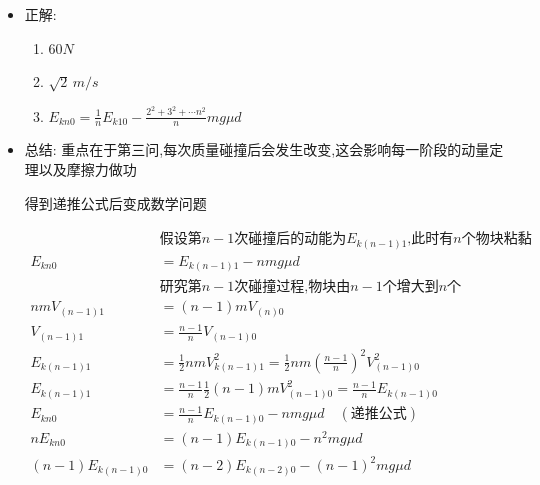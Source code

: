 \documentclass{article}
\begin{document}
\begin{itemize}
    \item 正解: \begin{enumerate}[label = (\arabic*)]
              \item $60N$
              \item $\sqrt{2} \, m \slash s$
              \item $E_{kn0} = \frac{1}{n} E_{k10} - \frac{2^{2} + 3^{2} + \cdots n^{2}}{n} mg\mu d$
          \end{enumerate}
    \item 总结: 重点在于第三问,每次质量碰撞后会发生改变,这会影响每一阶段的动量定理以及摩擦力做功

          \hspace{3em}得到递推公式后变成数学问题

          \begin{align*}
                                & \text{假设第}n-1\text{次碰撞后的动能为}  E_{k(n-1)1}\text{,此时有}n\text{个物块粘黏}                      \\
              E_{kn0}           & = E_{k(n-1)1} - nmg\mu d                                                               \\
                                & \text{研究第}n-1\text{次碰撞过程}     \text{,物块由}n-1\text{个增大到}n\text{个}                       \\
              nmV_{(n-1)1}      & = (n-1)mV_{(n)0}                                                                       \\
              V_{(n-1)1}        & = \frac{n-1}{n} V_{(n-1)0}                                                             \\
              E_{k(n-1)1}       & = \frac{1}{2} n m V_{k(n-1)1}^{2} = \frac{1}{2} n m (\frac{n-1}{n})^{2} V_{(n-1)0}^{2} \\
              E_{k(n-1)1}       & = \frac{n-1}{n} \frac{1}{2} (n-1) m V_{(n-1)0}^{2} = \frac{n-1}{n} E_{k(n-1)0}         \\
              E_{kn0}           & = \frac{n-1}{n} E_{k(n-1)0} - nmg \mu d \quad (\text{递推公式})                            \\
              n E_{kn0}         & = (n-1) E_{k(n-1)0} - n^{2} mg \mu d                                                   \\
              (n-1) E_{k(n-1)0} & = (n-2) E_{k(n-2)0} - (n-1)^{2}mg \mu d                                                \\

\end{align*}
\end{itemize}
\end{document}
